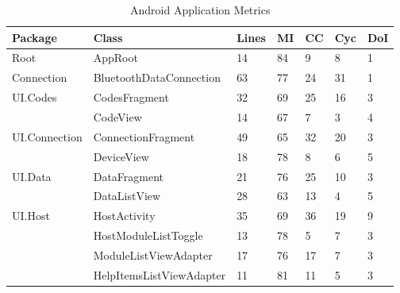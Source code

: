 {{\begin{table}[ht]
\begin{scriptsize}
\begin{center}
\begin{tabularx}{\textwidth}{| l | X | l | l | l | l | l |}
				\hline
				\textbf{Package} & \textbf{Class} & \textbf{Lines} & \textbf{MI} & \textbf{CC} & \textbf{Cyc} & \textbf{DoI}\\
				\hline
				Root & AppRoot & 14 & 84 & 9 & 8 & 1\\
				\hline
				Connection & BluetoothDataConnection & 63 & 77 & 24 & 31 & 1\\
				\hline
				\multirow{2}{*}{UI.Codes} & CodesFragment & 32 & 69 & 25 & 16 & 3\\\cline{2-7}
										  & CodeView & 14 & 67 & 7 & 3 & 4\\\cline{2-7}
				\hline
				\multirow{2}{*}{UI.Connection} & ConnectionFragment & 49 & 65 & 32 & 20 & 3\\\cline{2-7}
										  	   & DeviceView & 18 & 78 & 8 & 6 & 5\\\cline{2-7}
				\hline
				\multirow{2}{*}{UI.Data} & DataFragment & 21 & 76 & 25 & 10 & 3\\\cline{2-7}
     							  	     & DataListView & 28 & 63 & 13 & 4 & 5\\\cline{2-7}
				\hline
				\multirow{4}{*}{UI.Host} & HostActivity & 35 & 69 & 36 & 19 & 9\\\cline{2-7}
										 & HostModuleListToggle & 13 & 78 & 5 & 7 & 3\\\cline{2-7}
										 & ModuleListViewAdapter & 17 & 76 & 17 & 7 & 3\\\cline{2-7}
										 & HelpItemsListViewAdapter & 11 & 81 & 11 & 5 & 3\\\cline{2-7}
				\hline
				\end{tabularx}
				\caption{Android Application Metrics}
				\label{tab:AndroidApp}
			\end{center}
		\end{scriptsize}
		\end{table}		
		
		\begin{table}[ht]
		\begin{scriptsize}			
			\begin{center}				
				\begin{tabularx}{\textwidth}{| l | X | l | l | l | l | l |}
								

\end{tabularx}
\end{center}
\end{scriptsize}
\end{table}}}
